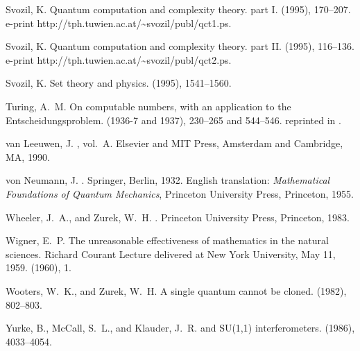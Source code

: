 \begin{thebibliography}{100}
{\sc Svozil, K.}
\newblock Quantum computation and complexity theory. part {I}.
 (1995), 170--207.
\newblock \\e-print http://tph.tuwien.ac.at/\~{}svozil/publ/qct1.ps.

{\sc Svozil, K.}
\newblock Quantum computation and complexity theory. part {II}.
 (1995), 116--136.
\newblock \\e-print http://tph.tuwien.ac.at/\~{}svozil/publ/qct2.ps.

{\sc Svozil, K.}
\newblock Set theory and physics.
 (1995), 1541--1560.

{\sc Turing, A.~M.}
\newblock On computable numbers, with an application to the
  {E}ntscheidungsproblem.
 (1936-7 and 1937), 230--265 and 544--546.
\newblock reprinted in \cite{davis}.

{\sc van Leeuwen, J.}
, vol.~A.
\newblock Elsevier and MIT Press, Amsterdam and Cambridge, MA, 1990.

{\sc von Neumann, J.}
.
\newblock Springer, Berlin, 1932.
\newblock English translation: {\sl Mathematical Foundations of Quantum
  Mechanics}, Princeton University Press, Princeton, 1955.

{\sc Wheeler, J.~A., and Zurek, W.~H.}
.
\newblock Princeton University Press, Princeton, 1983.

{\sc Wigner, E.~P.}
\newblock The unreasonable effectiveness of mathematics in the natural
  sciences. {R}ichard {C}ourant {L}ecture delivered at {N}ew {Y}ork
  {U}niversity, {M}ay 11, 1959.
 (1960), 1.

{\sc Wooters, W.~K., and Zurek, W.~H.}
\newblock A single quantum cannot be cloned.
 (1982), 802--803.

{\sc Yurke, B., McCall, S.~L., and Klauder, J.~R.}
 and {SU(1,1)} interferometers.
 (1986), 4033--4054.

\end{thebibliography}

%
%

\newpage
 \tableofcontents



